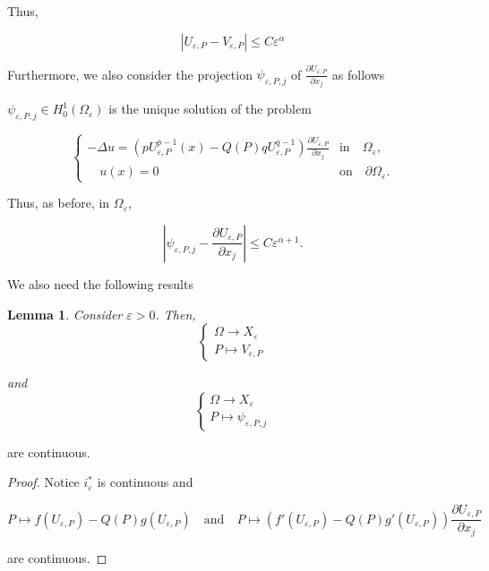 \documentclass[12pt]{amsart}
\theoremstyle{plain}
\newtheorem{lemma}[theorem]{Lemma}       %
\theoremstyle{definition}
\theoremstyle{remark}
\renewcommand{\epsilon}{\varepsilon}
\begin{document}
Thus,

$$|U_{\epsilon,P}-V_{\epsilon,P}|\leq C\epsilon^\alpha$$



\noindent Furthermore, we also consider the projection $\psi_{\epsilon,P,j}$ of $\frac{\partial U_{\epsilon,P}} {\partial x_j}$ as follows

$\psi_{\epsilon,P,j}\in H^1_0(\Omega_{\epsilon})$ is the unique solution of the problem


\begin{equation*}\label{Projection derivation} 
\begin{cases} 
  -\Delta u=\left(pU_{\epsilon,P}^{p-1}(x)-Q(P)qU_{\epsilon,P}^{q-1}\right)\frac{\partial U_{\epsilon,P}}{\partial x_j}&\text{in} \quad \Omega_{\epsilon}, \\
        
        \quad u(x) = 0&\text{on} \quad  \partial \Omega_{\epsilon}.
\end{cases}
\end{equation*} 



Thus, as before, in $\Omega_{\epsilon}$,

$$\left|\psi_{\epsilon,P,j}-\frac{\partial U_{\epsilon,P}}{\partial x_j}\right| \leq C\epsilon^{\alpha+1}.$$

We also need the following results

\begin{lemma}\label{Continuity P}
Consider $\epsilon >0$. Then, 
\begin{equation*}
\begin{cases}

\Omega \rightarrow X_{\epsilon}\\
 P \mapsto V_{\epsilon,P}
\end{cases}
\end{equation*}

and 
\begin{equation*}
\begin{cases}

\Omega \rightarrow X_{\epsilon}\\
 P \mapsto \psi_{\epsilon,P,j}
\end{cases}
\end{equation*}



\end{lemma}
are continuous.
\begin{proof}
Notice $i_{\epsilon}^*$ is continuous and 

$$P\mapsto f(U_{\epsilon,P})-Q(P) g(U_{\epsilon,P})\quad \text{and} \quad P\mapsto  (f'(U_{\epsilon,P})-Q(P) g'(U_{\epsilon,P}))\frac{\partial U_{\epsilon,P}}{\partial x_j}$$

are continuous.
\end{proof}
\end{document}
